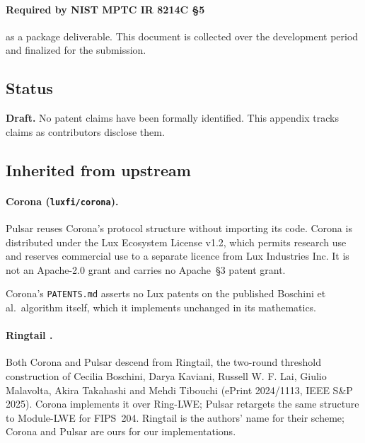 
\paragraph{Required by NIST MPTC IR 8214C \S5} as a package
deliverable. This document is collected over the development period
and finalized for the submission.

\subsection{Status}

\textbf{Draft.} No patent claims have been formally identified. This
appendix tracks claims as contributors disclose them.

\subsection{Inherited from upstream}

\paragraph{Corona (\texttt{luxfi/corona}).}
Pulsar reuses Corona's protocol structure without importing its code.
Corona is distributed under the Lux Ecosystem License v1.2, which
permits research use and reserves commercial use to a separate licence
from Lux Industries Inc. It is not an Apache-2.0 grant and carries no
Apache~\S3 patent grant.

Corona's \texttt{PATENTS.md} asserts no Lux patents on the published
Boschini et al.\ algorithm itself, which it implements unchanged in its
mathematics.

\paragraph{Ringtail \cite{boschini2024ringtail}.}
Both Corona and Pulsar descend from Ringtail, the two-round threshold
construction of Cecilia Boschini, Darya Kaviani, Russell W. F. Lai,
Giulio Malavolta, Akira Takahashi and Mehdi Tibouchi (ePrint 2024/1113,
IEEE S\&P 2025). Corona implements it over Ring-LWE; Pulsar retargets
the same structure to Module-LWE for FIPS~204. Ringtail is the authors'
name for their scheme; Corona and Pulsar are ours for our
implementations.

